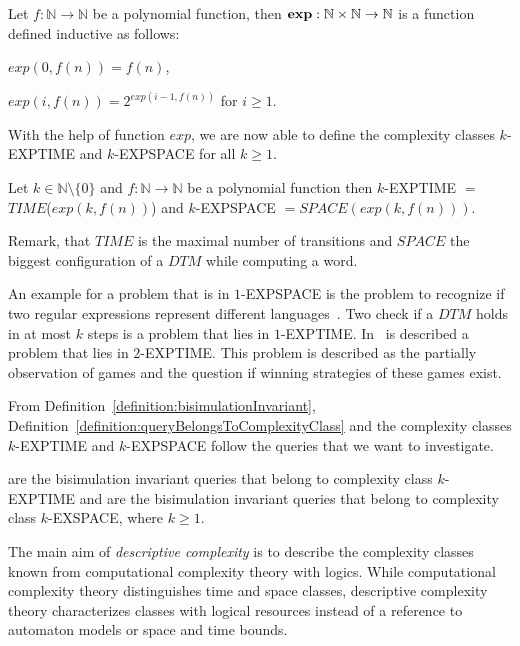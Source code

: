 \begin{definition}
    Let $f: \mathbb{N} \rightarrow \mathbb{N}$ be a polynomial function, then $\emph{exp}: \mathbb{N} \times \mathbb{N}
    \rightarrow \mathbb{N}$ is a function defined inductive as follows:
    \begin{compactitem}
        \item $exp(0, f(n)) = f(n)$,
        \item $exp(i, f(n)) = 2^{exp(i - 1, f(n))}$ for $i \geq 1$.
    \end{compactitem}
\end{definition}

With the help of function $exp$, we are now able to define the complexity classes $k$-EXPTIME and $k$-EXPSPACE for
all $k \geq 1$.

\begin{definition}
    Let $k \in \mathbb{N} \setminus \{0\}$ and $f: \mathbb{N} \rightarrow \mathbb{N}$ be a polynomial function then
    $k$-EXPTIME $=$ $\mathit{TIME}$($exp(k, f(n))$) and $k$-EXPSPACE $= \mathit{SPACE}(exp(k, f(n)))$.
\end{definition}

Remark, that $\mathit{TIME}$ is the maximal number of transitions and $\mathit{SPACE}$ the biggest configuration of a
$\mathit{DTM}$ while computing a word.

An example for a problem that is in $1$-EXPSPACE is the problem to recognize
if two regular expressions represent different languages~\cite{meyer1972equivalence}. Two check if a $\mathit{DTM}$
holds in at most $k$ steps is a problem that lies in $1$-EXPTIME. In~\cite{rintanen2004complexity} is described a
problem that lies in $2$-EXPTIME. This problem is described as the partially observation of games and the question if
winning strategies of these games exist.

From Definition~\ref{definition:bisimulationInvariant}, Definition~\ref{definition:queryBelongsToComplexityClass}
and the complexity classes $k$-EXPTIME and $k$-EXPSPACE follow the queries that we want to investigate.

\begin{definition}
    \label{definition:kExptimekExpspace}
     are the bisimulation invariant queries that belong to complexity class $k$-EXPTIME and
     are the bisimulation invariant queries that belong to complexity class $k$-EXSPACE, where $k \geq 1$.
\end{definition}

The main aim of \emph{descriptive complexity} is to describe the complexity classes known from
computational complexity theory with logics. While computational complexity theory distinguishes time and space
classes, descriptive complexity theory characterizes classes with logical resources instead of a reference to
automaton models or space and time bounds.

